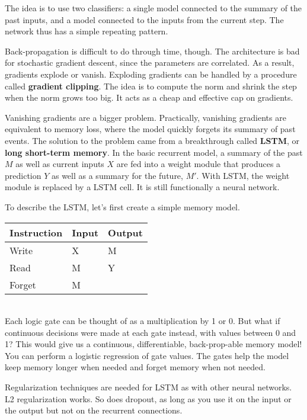 The idea is to use two classifiers: a single model connected to the summary of the past inputs, and a model connected to the inputs from the current step. The network thus has a simple repeating pattern. 

Back-propagation is difficult to do through time, though. The architecture is bad for stochastic gradient descent, since the parameters are correlated. As a result, gradients explode or vanish. Exploding gradients can be handled by a procedure called \textbf{gradient clipping}. The idea is to compute the norm and shrink the step when the norm grows too big. It acts as a cheap and effective cap on gradients. 

Vanishing gradients are a bigger problem. Practically, vanishing gradients are equivalent to memory loss, where the model quickly forgets its summary of past events. The solution to the problem came from a breakthrough called \textbf{LSTM}, or \textbf{long short-term memory}. In the basic recurrent model, a summary of the past $M$ as well as current inputs $X$ are fed into a weight module that produces a prediction $Y$ as well as a summary for the future, $M'$. With LSTM, the weight module is replaced by a LSTM cell. It is still functionally a neural network.

To describe the LSTM, let's first create a simple memory model. \\

\begin{tabular}{p{}p{}p{}}
Instruction & Input & Output \\
\hline
Write & X & M \\
Read & M & Y \\
Forget & M & \\
\end{tabular} \\

Each logic gate can be thought of as a multiplication by 1 or 0. But what if continuous decisions were made at each gate instead, with values between 0 and 1? This would give us a continuous, differentiable, back-prop-able memory model! You can perform a logistic regression of gate values. The gates help the model keep memory longer when needed and forget memory when not needed. 

Regularization techniques are needed for LSTM as with other neural networks. L2 regularization works. So does dropout, as long as you use it on the input or the output but not on the recurrent connections. 

